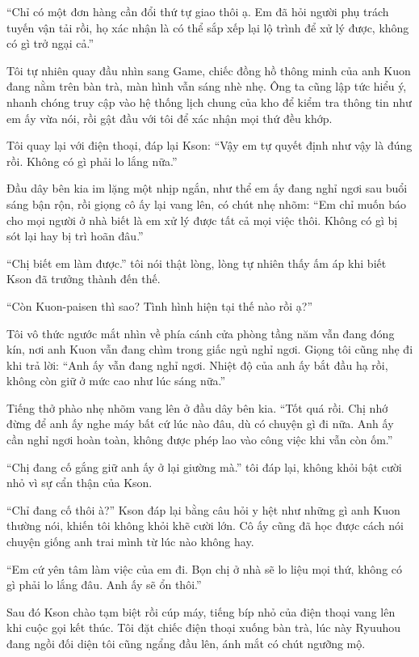\documentclass[../main.tex]{subfiles}
\begin{document}
``Chỉ có một đơn hàng cần đổi thứ tự giao thôi ạ. Em đã hỏi người phụ trách tuyến vận tải rồi, họ xác nhận là có thể sắp xếp lại lộ trình để xử lý được, không có gì trở ngại cả.''

Tôi tự nhiên quay đầu nhìn sang Game, chiếc đồng hồ thông minh của anh Kuon đang nằm trên bàn trà, màn hình vẫn sáng nhè nhẹ. Ông ta cũng lập tức hiểu ý, nhanh chóng truy cập vào hệ thống lịch chung của kho để kiểm tra thông tin như em ấy vừa nói, rồi gật đầu với tôi để xác nhận mọi thứ đều khớp.

Tôi quay lại với điện thoại, đáp lại Kson: ``Vậy em tự quyết định như vậy là đúng rồi. Không có gì phải lo lắng nữa.''

Đầu dây bên kia im lặng một nhịp ngắn, như thể em ấy đang nghỉ ngơi sau buổi sáng bận rộn, rồi giọng cô ấy lại vang lên, có chút nhẹ nhõm: ``Em chỉ muốn báo cho mọi người ở nhà biết là em xử lý được tất cả mọi việc thôi. Không có gì bị sót lại hay bị trì hoãn đâu.''

``Chị biết em làm được.'' tôi nói thật lòng, lòng tự nhiên thấy ấm áp khi biết Kson đã trưởng thành đến thế.

``Còn Kuon-paisen thì sao? Tình hình hiện tại thế nào rồi ạ?''

Tôi vô thức ngước mắt nhìn về phía cánh cửa phòng tầng năm vẫn đang đóng kín, nơi anh Kuon vẫn đang chìm trong giấc ngủ nghỉ ngơi. Giọng tôi cũng nhẹ đi khi trả lời: ``Anh ấy vẫn đang nghỉ ngơi. Nhiệt độ của anh ấy bắt đầu hạ rồi, không còn giữ ở mức cao như lúc sáng nữa.''

Tiếng thở phào nhẹ nhõm vang lên ở đầu dây bên kia. ``Tốt quá rồi. Chị nhớ đừng để anh ấy nghe máy bất cứ lúc nào đâu, dù có chuyện gì đi nữa. Anh ấy cần nghỉ ngơi hoàn toàn, không được phép lao vào công việc khi vẫn còn ốm.''

``Chị đang cố gắng giữ anh ấy ở lại giường mà.'' tôi đáp lại, không khỏi bật cười nhỏ vì sự cẩn thận của Kson.

``Chỉ đang cố thôi à?'' Kson đáp lại bằng câu hỏi y hệt như những gì anh Kuon thường nói, khiến tôi không khỏi khẽ cười lớn. Cô ấy cũng đã học được cách nói chuyện giống anh trai mình từ lúc nào không hay.

``Em cứ yên tâm làm việc của em đi. Bọn chị ở nhà sẽ lo liệu mọi thứ, không có gì phải lo lắng đâu. Anh ấy sẽ ổn thôi.''

Sau đó Kson chào tạm biệt rồi cúp máy, tiếng bíp nhỏ của điện thoại vang lên khi cuộc gọi kết thúc. Tôi đặt chiếc điện thoại xuống bàn trà, lúc này Ryuuhou đang ngồi đối diện tôi cũng ngẩng đầu lên, ánh mắt có chút ngưỡng mộ.
\end{document}
